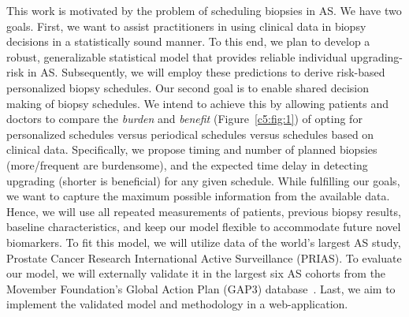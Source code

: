 This work is motivated by the problem of scheduling biopsies in AS. We have two goals. First, we want to assist practitioners in using clinical data in biopsy decisions in a statistically sound manner. To this end, we plan to develop a robust, generalizable statistical model that provides reliable individual upgrading-risk in AS. Subsequently, we will employ these predictions to derive risk-based personalized biopsy schedules. Our second goal is to enable shared decision making of biopsy schedules. We intend to achieve this by allowing patients and doctors to compare the \emph{burden} and \emph{benefit} (Figure~\ref{c5:fig:1}) of opting for personalized schedules versus periodical schedules versus schedules based on clinical data. Specifically, we propose timing and number of planned biopsies (more/frequent are burdensome), and the expected time delay in detecting upgrading (shorter is beneficial) for any given schedule. While fulfilling our goals, we want to capture the maximum possible information from the available data. Hence, we will use all repeated measurements of patients, previous biopsy results, baseline characteristics, and keep our model flexible to accommodate future novel biomarkers. To fit this model, we will utilize data of the world's largest AS study, Prostate Cancer Research International Active Surveillance (PRIAS). To evaluate our model, we will externally validate it in the largest six AS cohorts from the Movember Foundation's Global Action Plan (GAP3) database~\citep{gap3_2018}. Last, we aim to implement the validated model and methodology in a web-application.